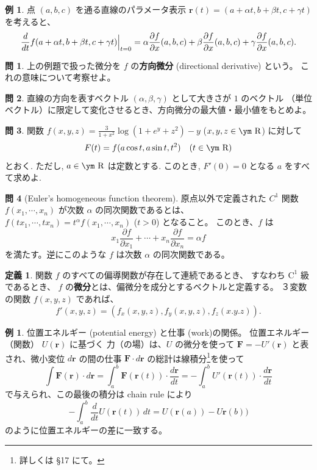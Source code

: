\documentclass[a4paper]{jsarticle}
\theoremstyle{definition}
\newtheorem{Definition}[Theorem]{定義}
\newtheorem{Example}[Theorem]{例}
\newtheorem{Exercise}{問}%
\theoremstyle{remark}
\newcommand{\R}{\text{\ym R}}
\begin{document}
\begin{Example}
点 $(a,b,c)$ を通る直線のパラメータ表示 $\bm{r}(t) = (a + \alpha t, b + \beta t, c + \gamma t)$ 
を考えると、
\[
\Bigl. \frac{d}{dt} f(a+\alpha t, b + \beta t, c + \gamma t) \Bigr|_{t=0}  
= \alpha \frac{\partial f}{\partial x}(a,b,c)
+ \beta \frac{\partial f}{\partial x}(a,b,c)
+ \gamma \frac{\partial f}{\partial x}(a,b,c). 
\]
\end{Example} 

\begin{Exercise}
上の例題で扱った微分を $f$ の\textbf{方向微分} (directional derivative) という。
これの意味について考察せよ。
\end{Exercise}

\begin{Exercise}
直線の方向を表すベクトル $(\alpha,\beta,\gamma)$ として大きさが $1$ のベクトル
（単位ベクトル）に限定して変化させるとき、方向微分の最大値・最小値をもとめよ。  
\end{Exercise}

\begin{Exercise}
関数
$\displaystyle 
f(x, y, z) =
\frac{3}{1 + x^2} \log(1 + e^y + z^2) - y$ ($x, y, z \in \R$) に対して
\[
F(t) = f(a \cos t, a \sin t, t^2)\quad (t \in \R)
\]
とおく. ただし, $a \in \R$ は定数とする. このとき, $F'(0) = 0$ となる $a$ をすべて求めよ.
\end{Exercise}

\begin{Exercise}[Euler's homogeneous function theorem]
原点以外で定義された $C^1$ 関数 $f(x_1,\cdots,x_n)$ が次数 $\alpha$ の同次関数であるとは、
$f(tx_1,\cdots,tx_n) = t^\alpha f(x_1,\cdots,x_n)$ ($t>0$) となること。
このとき、$f$ は
\[
  x_1\frac{\partial f}{\partial x_1} + \cdots + x_n\frac{\partial f}{\partial x_n} 
  = \alpha f%
\]
を満たす。逆にこのような $f$ は次数 $\alpha$ の同次関数である。
\end{Exercise}

\begin{Definition}
関数 $f$ のすべての偏導関数が存在して連続であるとき、
すなわち $\text{C}^1$ 級であるとき、 
$f$ の\textbf{微分}とは、偏微分を成分とするベクトルと定義する。
３変数の関数 $f(x,y,z)$ であれば、
\[
f'(x,y,z) = (f_x(x,y,z), f_y(x,y,z), f_z(x.y.z)). 
\]
\end{Definition}

\begin{Example}
  位置エネルギー (potential energy) と仕事 (work)の関係。
  位置エネルギー（関数） $U(\bm{r})$ に基づく
  力（の場）は、$U$ の微分を使って $\bm{F} = -U'(\bm{r})$ と表され、微小変位 $d\bm{r}$ の間の仕事
  $\bm{F}\cdot d\bm{r}$ の総計は線積分\footnote{詳しくは \S 17 にて。}を使って
  \[
    \int \bm{F}(\bm{r})\cdot d\bm{r} = \int_a^b \bm{F}(\bm{r}(t))\cdot \frac{d\bm{r}}{dt}
    = - \int_a^b U'(\bm{r}(t))\cdot \frac{d\bm{r}}{dt}
  \]
  で与えられ、この最後の積分は chain rule により
  \[
   - \int_a^b \frac{d}{dt} U(\bm{r}(t))\, dt
    = U(\bm{r}(a)) - U\bm{r}(b)) 
  \]
 のように位置エネルギーの差に一致する。
\end{Example}
\end{document}
